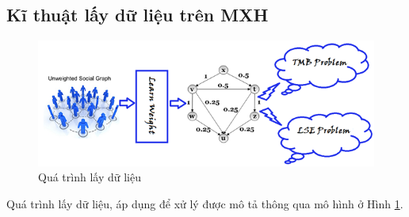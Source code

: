 \subsection{Kĩ thuật lấy dữ liệu trên MXH}
\begin{center}
	\begin{figure}[htp]
		\begin{center}
			\includegraphics [scale=.5]{picture/Hinh3_1}
		\end{center}
		\caption{Quá trình lấy dữ liệu}
		\label{refhinh3_1}
	\end{figure}
\end{center}
Quá trình lấy dữ liệu, áp dụng để xử lý được mô tả thông qua mô hình ở Hình \ref {refhinh3_1}.
